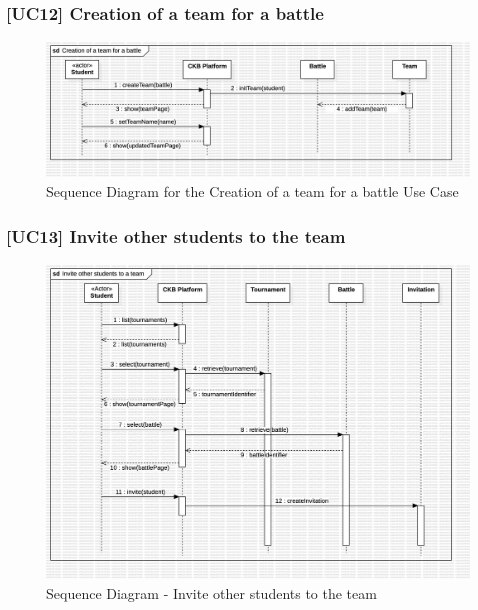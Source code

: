 \subsubsection*{[UC12] Creation of a team for a battle}
\begin{figure}[H]
    \centering
    \includegraphics[width=\textwidth]{Diagrams/UC12SequenceDiagram.jpg}
    \caption{Sequence Diagram for the Creation of a team for a battle Use Case}
    \label{fig:sequence-diagram-create-team}
\end{figure}

\subsubsection*{[UC13] Invite other students to the team}
\begin{figure}[H]
    \centering
    \includegraphics[width=\textwidth]{Diagrams/StudentInvitation.jpg}
    \caption{Sequence Diagram - Invite other students to the team}
    \label{fig:sequence-diagram-invite-students}
\end{figure}

